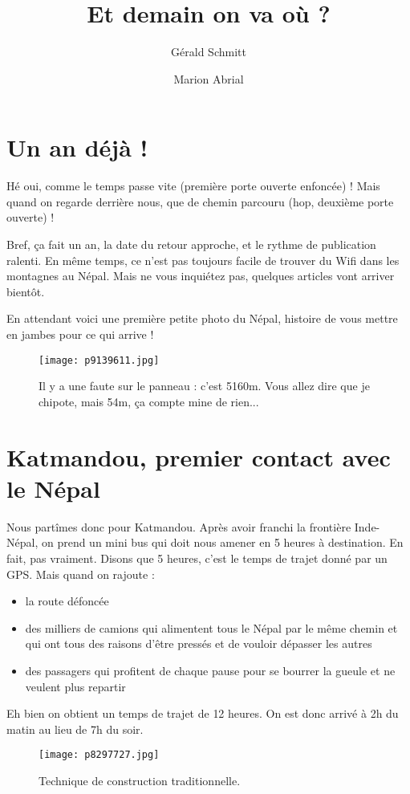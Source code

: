 \documentclass{book}
\title{Et demain on va où ?}
\author{Gérald Schmitt \and Marion Abrial}
\begin{document}
\maketitle




\chapter{Un an déjà !}
Hé oui, comme le temps passe vite (première porte ouverte enfoncée) ! Mais quand on regarde derrière nous, que de chemin parcouru (hop, deuxième porte ouverte) !

Bref, ça fait un an, la date du retour approche, et le rythme de publication  ralenti. En même temps, ce n'est pas toujours facile de trouver du Wifi dans les montagnes au Népal. Mais ne vous inquiétez pas, quelques articles vont arriver bientôt.

En attendant voici une première petite photo du Népal, histoire de vous mettre en jambes pour ce qui arrive !


\begin{figure}[h]
\centering
\texttt{[image: p9139611.jpg]}
\caption*{Il y a une faute sur le panneau : c'est 5160m. Vous allez dire que je chipote, mais 54m, ça compte mine de rien...}
\end{figure}

\chapter{Katmandou, premier contact avec le Népal}
Nous partîmes donc pour Katmandou. Après avoir franchi la frontière Inde-Népal, on prend un mini bus qui doit nous amener en 5 heures à destination. En fait, pas vraiment. Disons que 5 heures, c'est le temps de trajet donné par un GPS. Mais quand on rajoute :
\begin{itemize}
	\item la route défoncée
	\item des milliers de camions qui alimentent tous le Népal par le même chemin et qui ont tous des raisons d'être pressés et de vouloir dépasser les autres
	\item des passagers qui profitent de chaque pause pour se bourrer la gueule et ne veulent plus repartir
\end{itemize}
Eh bien on obtient un temps de trajet  de 12 heures. On est donc arrivé à 2h du matin au lieu de 7h du soir.


\begin{figure}[h]
\centering
\texttt{[image: p8297727.jpg]}
\caption*{Technique de construction traditionnelle.}
\end{figure}
\end{document}
